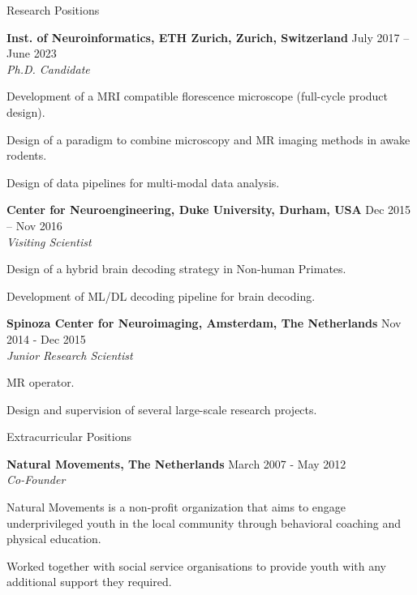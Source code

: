 \documentclass{resume}
\begin{document}
\begin{sections}{Research Positions}

{\bf Inst. of Neuroinformatics, ETH Zurich, Zurich, Switzerland} \hfill {July 2017 – June 2023} 
\\{\textit{Ph.D. Candidate}}
\begin{resumeitemize}
\item Development of a MRI compatible florescence microscope (full-cycle product design).
\item Design of a paradigm to combine microscopy and MR imaging methods in awake rodents.
\item Design of data pipelines for multi-modal data analysis.
\end{resumeitemize}

{\bf Center for Neuroengineering, Duke University, Durham, USA} \hfill {Dec 2015 – Nov 2016} 
\\{\textit{Visiting Scientist}}
\begin{resumeitemize}
\item Design of a hybrid brain decoding strategy in Non-human Primates.
\item Development of ML/DL decoding pipeline for brain decoding.
\end{resumeitemize}

{\bf Spinoza Center for Neuroimaging, Amsterdam, The Netherlands} \hfill {Nov 2014 - Dec 2015} 
\\{\textit{Junior Research Scientist}}
\begin{resumeitemize}
\item MR operator.
\item Design and supervision of several large-scale research projects.
\end{resumeitemize}

\end{sections}

\begin{sections}{Extracurricular Positions}

{\bf Natural Movements, The Netherlands} \hfill {March 2007 - May 2012} 
\\{\textit{Co-Founder}}
\begin{resumeitemize}
\item Natural Movements is a non-profit organization that aims to engage underprivileged youth in the local community through behavioral coaching and physical education.
\item Worked together with social service organisations to provide youth with any additional support they required.
\end{resumeitemize}

\end{sections}
\end{document}

